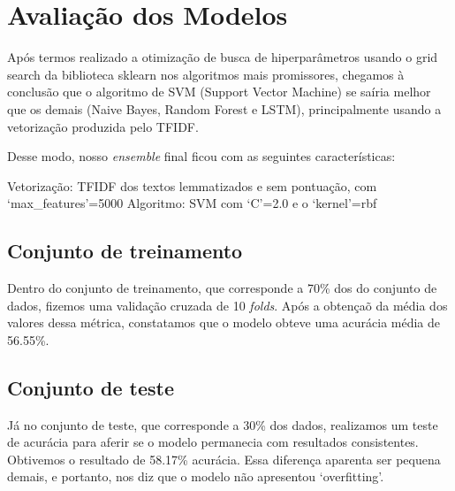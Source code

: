 \section{Avaliação dos Modelos}
\label{sec:model_eval}

Após termos realizado a otimização de busca de hiperparâmetros usando o grid search da biblioteca sklearn nos algoritmos mais promissores, chegamos à conclusão que o algoritmo de SVM (Support Vector Machine) se saíria melhor que os demais (Naive Bayes, Random Forest e LSTM), principalmente usando a vetorização produzida pelo TFIDF.

Desse modo, nosso \emph{ensemble} final ficou com as seguintes características:

Vetorização: TFIDF dos textos lemmatizados e sem pontuação, com `max\_features'=5000
Algoritmo: SVM com `C'=2.0 e o `kernel'=rbf

\subsection{Conjunto de treinamento}

Dentro do conjunto de treinamento, que corresponde a 70\% dos do conjunto de dados, fizemos uma validação cruzada de 10 \emph{folds}. Após a obtençaõ da média dos valores dessa métrica, constatamos que o modelo obteve uma acurácia média de 56.55\%.

\subsection{Conjunto de teste}

Já no conjunto de teste, que corresponde a 30\% dos dados, realizamos um teste de acurácia para aferir se o modelo permanecia com resultados consistentes. Obtivemos o resultado de 58.17\% acurácia. Essa diferença aparenta ser pequena demais, e portanto, nos diz que o modelo não apresentou `overfitting'.